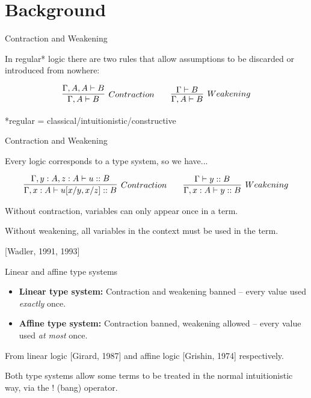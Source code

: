 \documentclass[10pt]{beamer}
\begin{document}
\section{Background}

\begin{frame}{Contraction and Weakening}

In regular* logic there are two rules that allow assumptions to be discarded or introduced from nowhere:

$$
\infer[Contraction]{\Gamma, A \vdash B}{
	\Gamma, A, A \vdash B
}
\qquad
\infer[Weakening]{\Gamma, A \vdash B}{
    \Gamma \vdash B
}
$$

*regular = classical/intuitionistic/constructive

\end{frame}

\begin{frame}{Contraction and Weakening}

Every logic corresponds to a type system, so we have...

\begin{eqnarray*}
\infer[Contraction]{\Gamma, x : A \vdash u[x/y, x/z] :: B}{
	\Gamma, y : A, z : A \vdash u :: B
}
\qquad
\infer[Weakening]{\Gamma, x : A \vdash y :: B}{
    \Gamma\vdash y :: B
}
\end{eqnarray*}

Without contraction, variables can only appear once in a term.

Without weakening, all variables in the context must be used in the term.

[Wadler, 1991, 1993]

\end{frame}

\begin{frame}{Linear and affine type systems}

\begin{itemize}
\item \textbf{Linear type system:} Contraction and weakening banned -- every value used \textit{exactly} once.
\item \textbf{Affine type system:} Contraction banned, weakening allowed -- every value used \textit{at most} once.
\end{itemize}

From linear logic [Girard, 1987] and affine logic [Grishin, 1974] respectively.

Both type systems allow some terms to be treated in the normal intuitionistic way, via the ! (bang) operator.

\end{frame}
\end{document}
